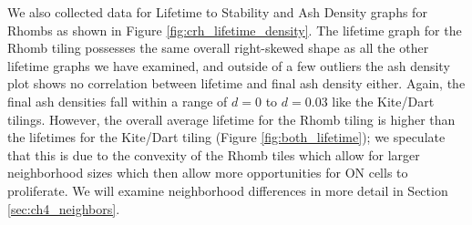 \documentclass[a4paper,11pt]{report}
\begin{document}
We also collected data for Lifetime to Stability and Ash Density graphs for Rhombs as shown in Figure \ref{fig:crh_lifetime_density}. The lifetime graph for the Rhomb tiling possesses the same overall right-skewed shape as all the other lifetime graphs we have examined, and outside of a few outliers the ash density plot shows no correlation between lifetime and final ash density either. Again, the final ash densities fall within a range of $d=0$ to $d=0.03$ like the Kite/Dart tilings. However, the overall average lifetime for the Rhomb tiling is higher than the lifetimes for the Kite/Dart tiling (Figure \ref{fig:both_lifetime}); we speculate that this is due to the convexity of the Rhomb tiles which allow for larger neighborhood sizes which then allow more opportunities for ON cells to proliferate. We will examine neighborhood differences in more detail in Section \ref{sec:ch4_neighbors}.
\end{document}
